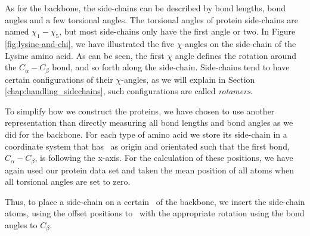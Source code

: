 As for the backbone, the side-chains can be described by bond lengths,
bond angles and a few torsional angles.  The torsional angles of
protein side-chains are named $\chi_1-\chi_5$, but most side-chains
only have the first angle or two. In Figure \ref{fig:lysine-and-chi},
we have illustrated the five $\chi$-angles on the side-chain of the
Lysine amino acid. As can be seen, the first $\chi$ angle defines the
rotation around the $C_\alpha-C_\beta$ bond, and so forth along the
side-chain. Side-chains tend to have certain configurations of their
$\chi$-angles, as we will explain in Section
\ref{chap:handling_sidechains}, such configurations are called
\textit{rotamers}.

To simplify how we construct the proteins, we have chosen to use
another representation than directly measuring all bond lengths and
bond angles as we did for the backbone. For each type of amino acid we
store its side-chain in a coordinate system that has \Ca\ as origin and
orientated such that the first bond, $C_\alpha-C_\beta$, is following
the x-axis. For the calculation of these positions, we have again used
our protein data set and taken the mean position of all atoms when all
torsional angles are set to zero.

Thus, to place a side-chain on a certain \Ca\ of the backbone, we
insert the side-chain atoms, using the offset positions to \Ca\ with
the appropriate rotation using the bond angles to $C_\beta$.

